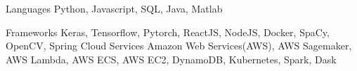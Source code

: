 
\begin{cvskills}
  \cvskill
    {Languages} %
    {Python, Javascript, SQL, Java, Matlab} %

  \cvskill
    {Frameworks} %
    {Keras, Tensorflow, Pytorch, ReactJS, NodeJS, Docker, SpaCy, OpenCV, Spring} %
  \cvskill
    {Cloud Services}
    {Amazon Web Services(AWS), AWS Sagemaker, AWS Lambda, AWS ECS, AWS EC2, DynamoDB, Kubernetes, Spark, Dask}
    
\end{cvskills}
